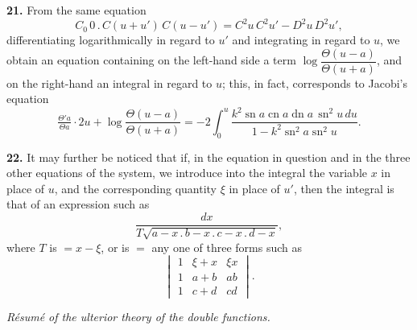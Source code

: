 \documentclass[11pt]{article}
\begin{document}
\medskip

\textbf{21.} From the same equation
\[
C\!_0\,0\mathbin{.}C(u + u')\,C(u - u') = C^2 u\, C^2 u' - D^2 u\, D^2 u',
\]
differentiating logarithmically in regard to $u'$ and integrating in regard to $u$, we obtain an equation containing on the left-hand side a term $\log\dfrac{\Theta(u - a)}{\Theta(u + a)}$, and on the right-hand an integral in regard to $u$; this, in fact, corresponds to Jacobi's equation
\[
\tfrac{\Theta'a}{\Theta a}\cdot 2u + \log\frac{\Theta(u - a)}{\Theta(u + a)} = -2\int_0^u \frac{k^2\operatorname{sn} a\operatorname{cn} a\operatorname{dn} a\,\operatorname{sn}^2 u\,du}{1 - k^2\operatorname{sn}^2 a\operatorname{sn}^2 u}.
\]

\medskip

\textbf{22.} It may further be noticed that if, in the equation in question and in the three other equations of the system, we introduce into the integral the variable $x$ in place of $u$, and the corresponding quantity $\xi$ in place of $u'$, then the integral is that of an expression such as
\[
\frac{dx}{T\sqrt{a-x\mathbin{.}b-x\mathbin{.}c-x\mathbin{.}d-x}},
\]
where $T$ is $= x - \xi$, or is $= $ any one of three forms such as
\[
\begin{vmatrix} 1 & \xi + x & \xi x \\ 1 & a + b & ab \\ 1 & c + d & cd \end{vmatrix}.
\]

\medskip

\textit{R\'esum\'e of the ulterior theory of the double functions.}

\medskip
\end{document}
